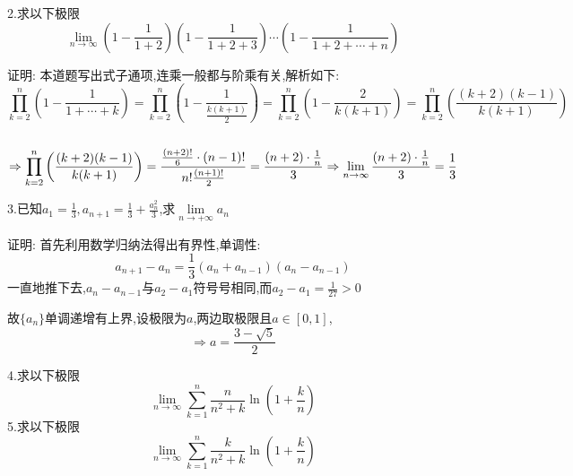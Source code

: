 \documentclass{ctexart}
\begin{document}
	\begin{tcolorbox}[title = {综合性问题},colbacktitle=red!25!white,colback=white,arc = 2mm, outer arc = 2mm,fonttitle = \itshape, fontupper = \itshape, fontlower = \itshape]
	
		2.求以下极限
	$$\lim_{n \to \infty} \left(1-\frac{1}{1+2}\right)\left(1-\frac{1}{1+2+3}\right) \cdots\left(1-\frac{1}{1+2+\cdots+n}\right)$$
	\begin{tcolorbox}[colback=white,arc = 1mm, outer arc = 1mm,fonttitle = \itshape, fontupper = \itshape, fontlower = \itshape]
		{\color{red}证明:}
	本道题写出式子通项,连乘一般都与阶乘有关,解析如下: \\
	$$\prod_{k=2}^{n}\left ( 1-\frac{1}{1+\cdots+k}\right ) = \prod_{k=2}^{n}\left ( 1-\frac{1}{\frac{k\left (k+1  \right ) }{2} }\right )=\prod_{k=2}^{n}\left ( 1-\frac{2}{k\left (k+1 \right) } \right)=\prod_{k=2}^{n}\left ( \frac{\left( k+2\right)\left(k-1\right)}{k\left(k+1 \right)} \right) $$ \\
	$$ \Rightarrow \prod_{k=2}^{n}\left(\frac{(k+2)(k-1)}{k(k+1)}\right)=\frac{\frac{\left (n+2 \right)!}{6}\cdot \small \left ( n-1\right)!}{\small n!\frac{\left (n+1\right )!}{2}}=
	\frac{\small\left (n+2 \right )\cdot \large \frac{1}{n}}{\small3} \Rightarrow\lim_{n \to \infty} 
	\frac{\small \left (n+2 \right )\cdot \large \frac{1}{n}}{\small 3}=\small \frac{1}{3}   $$  
	\end{tcolorbox}
   3.已知$a_{1}=\frac{1}{3},a_{n+1}=\displaystyle{\frac{1}{3}+\frac{a^{2}_{n}}{3}}$,求$\lim\limits_{n \to +\infty}a_{n}$
   
   	\begin{tcolorbox}[colback=white,arc = 1mm, outer arc = 1mm,fonttitle = \itshape, fontupper = \itshape, fontlower = \itshape]
   	{\color{red}证明:}
   	 首先利用数学归纳法得出有界性,单调性:
   	   $$a_{n+1}-a_{n}=\frac{1}{3}\left(a_{n}+a_{n-1}\right) \left(a_{n}-a_{n-1} \right) $$
   	   一直地推下去,$a_{n}-a_{n-1}$与$a_{2}-a_{1}$符号号相同,而$a_{2}-a_{1}=\frac{1}{27} > 0$
   	   
   	   故$\{a_{n}\}$单调递增有上界,设极限为$a$,两边取极限且$a \in [0,1]$,$$\Rightarrow a=\frac{3-\sqrt{5}}{2} $$
   \end{tcolorbox}
   4.求以下极限
   $$\lim _{n \rightarrow \infty} \sum_{k=1}^{n} \frac{n}{n^{2}+k} \ln \left(1+\frac{k}{n}\right)$$
   5.求以下极限
   $$\lim _{n \rightarrow \infty} \sum_{k=1}^{n} \frac{k}{n^{2}+k} \ln \left(1+\frac{k}{n}\right)$$
     \begin{tcolorbox}[title =补充,colbacktitle=blue!85!white,colback=white,arc = 3mm, outer arc = 3mm,fonttitle = \itshape, fontupper = \itshape, fontlower = \itshape]


\end{tcolorbox}
\end{tcolorbox}
\end{document}
